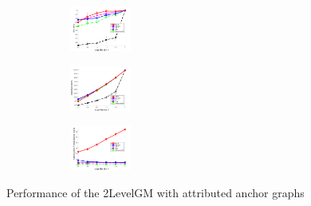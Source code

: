 \documentclass[hyperref={pdfpagelabels=false}]{beamer}
\begin{document}
\begin{frame}[allowframebreaks]
\vspace{-20pt}
\begin{figure}[h]
		\begin{subfigure}[b]{0.32\textwidth}
			\centering
			\includegraphics[width=2cm]{"fig/evaluation/SyntheticTest/descr/Results_v4.3.3/Test4/accuracy_avg10t"} 
		\end{subfigure}%
		\begin{subfigure}[b]{0.32\textwidth}
			\centering
			\includegraphics[width=2cm]{"fig/evaluation/SyntheticTest/descr/Results_v4.3.3/Test4/score_avg10t"} 
		\end{subfigure} 
		\begin{subfigure}[b]{0.32\textwidth}
			\centering
			\includegraphics[width=2cm]{"fig/evaluation/SyntheticTest/descr/Results_v4.3.3/Test4/time_summary_avg10t"} 
		\end{subfigure} 	
\end{figure}
Performance of the 2LevelGM with attributed anchor graphs
\framebreak


\end{frame}
\end{document}
